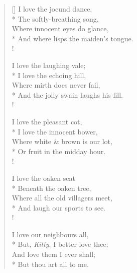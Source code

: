 \documentclass[MAIN]{subfiles}
\begin{document}
\settowidth{\versewidth}{\vin And where lisps the maiden's tongue.}
\begin{verse}[\versewidth]
I love the jocund dance,\\*
\vin The softly-breathing song,\\
Where innocent eyes do glance,\\*
\vin And where lisps the maiden's tongue.\\!

I love the laughing vale;\\*
\vin I love the echoing hill,\\
Where mirth does never fail,\\*
\vin And the jolly swain laughs his fill.\\!

I love the pleasant cot,\\*
\vin I love the innocent bower,\\
Where white \& brown is our lot,\\*
\vin Or fruit in the midday hour.\\!

I love the oaken seat\\*
\vin Beneath the oaken tree,\\
Where all the old villagers meet,\\*
\vin And laugh our sports to see.\\!

I love our neighbours all,\\*
\vin But, \emph{Kitty}, I better love thee;\\
And love them I ever shall;\\*
\vin But thou art all to me.
\end{verse}
\end{document}
